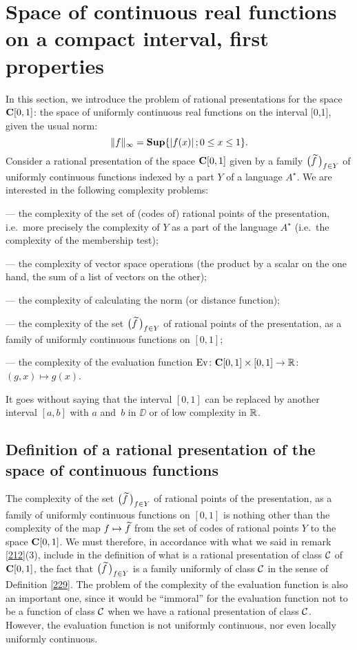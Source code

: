 \section[Continuous real functions on a compact interval \ldots]{Space of continuous real functions on a compact interval, first properties}\label{sec3}

In this section, we introduce the problem of rational presentations for the space ${{\bf C}[0,1]}$: the space of uniformly continuous real functions on the interval [0,1], given the usual norm:
\[
\lVert f \rVert_{\infty} = {\bf Sup} \{ \left|{f(x)}\right| ; 0 \leq x \leq 1 \}.
\] 
Consider a rational presentation of the space ${{\bf C}[0,1]}$ given by a family $\big(\widetilde{f}\,\big)_{f \in Y}$ of uniformly continuous functions indexed by a part $Y$ of a language $A^{\star}$. We are interested in the following complexity problems:

\noindent 
--- the complexity of the set of (codes of) rational points of the presentation, i.e.\ more precisely the complexity of $Y$ as a part of the language $A^{\star}$ (i.e.\ the complexity of the membership test);

\noindent 
--- the complexity of vector space operations (the product by a scalar on the one hand, the sum of a list of vectors on the other);

\noindent 
--- the complexity of calculating the norm (or distance function);

\noindent 
--- the complexity of the set $\big(\widetilde{f}\,\big)_{f \in Y}$ of rational points of the presentation, as a family of uniformly continuous functions on $[0,1]$;

\noindent 
--- the complexity of the evaluation function ${\rm Ev}\colon {{\bf C}[0,1]} \times [0,1] \to \mathbb {R}$: $ (g,x) \mapsto g(x)$.

\noindent 
It goes without saying that the interval $[0,1]$ can be replaced by another interval $[a,b]$ with $a$ and~$b$ in $\DD$ or of low complexity in $\mathbb {R}$. 

\subsection{Definition of a rational presentation of the space of continuous functions}\label{subsec31}
 
The complexity of the set $\big(\widetilde{f}\,\big)_{f \in Y}$ of rational points of the presentation, as a family of uniformly continuous functions on $[0,1]$ is nothing other than the complexity of the map $f \mapsto \widetilde{f}$ from the set of codes of rational points $Y$ to the space ${{\bf C}[0,1]}$. 
We must therefore, in accordance with what we said in remark \ref{212}(3), include in the definition of what is a rational presentation of class ${{\cal C}}$ of ${{\bf C}[0,1]}$, the fact that $\big(\widetilde{f}\,\big)_{f \in Y}$ is a family uniformly of class ${{\cal C}}$ in the sense of Definition \ref{229}.
The problem of the complexity of the evaluation function is also an important one, since it would be ``immoral'' for the evaluation function not to be a function of class ${{\cal C}}$ when we have a rational presentation of class ${{\cal C}}$. 
However, the evaluation function is not uniformly continuous, nor even locally uniformly continuous.

